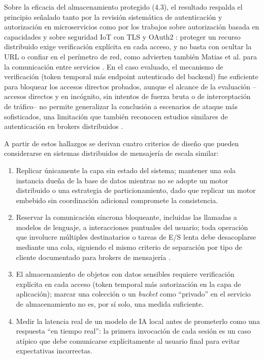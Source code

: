 Sobre la eficacia del almacenamiento protegido (4.3), el resultado respalda
el principio señalado tanto por la revisión sistemática de autenticación y
autorización en microservicios \cite{ref12} como por los trabajos sobre
autorización basada en capacidades \cite{ref11} y sobre seguridad IoT con TLS
y OAuth2 \cite{ref14}: proteger un recurso distribuido exige verificación
explícita en cada acceso, y no basta con ocultar la URL o confiar en el
perímetro de red, como advierten también Matias et al. para la comunicación
entre servicios \cite{ref3}. En el caso evaluado, el mecanismo de
verificación (token temporal más endpoint autenticado del backend) fue
suficiente para bloquear los accesos directos probados, aunque el alcance de
la evaluación --accesos directos y en incógnito, sin intentos de fuerza bruta
o de interceptación de tráfico-- no permite generalizar la conclusión a
escenarios de ataque más sofisticados, una limitación que también reconocen
estudios similares de autenticación en brokers distribuidos \cite{ref13}.

A partir de estos hallazgos se derivan cuatro criterios de diseño que pueden
considerarse en sistemas distribuidos de mensajería de escala similar:

\begin{enumerate}
  \item Replicar únicamente la capa sin estado del sistema; mantener una
  sola instancia dueña de la base de datos mientras no se adopte un motor
  distribuido o una estrategia de particionamiento, dado que replicar un
  motor embebido sin coordinación adicional compromete la consistencia.
  \item Reservar la comunicación síncrona bloqueante, incluidas las
  llamadas a modelos de lenguaje, a interacciones puntuales del usuario;
  toda operación que involucre múltiples destinatarios o tareas de E/S
  lenta debe desacoplarse mediante una cola, siguiendo el mismo criterio de
  separación por tipo de cliente documentado para brokers de mensajería
  \cite{ref2}.
  \item El almacenamiento de objetos con datos sensibles requiere
  verificación explícita en cada acceso (token temporal más autorización en
  la capa de aplicación); marcar una colección o un \emph{bucket} como
  ``privado'' en el servicio de almacenamiento no es, por sí solo, una
  medida suficiente.
  \item Medir la latencia real de un modelo de IA local antes de
  prometerlo como una respuesta ``en tiempo real'': la primera invocación
  de cada sesión es un caso atípico que debe comunicarse explícitamente al
  usuario final para evitar expectativas incorrectas.
\end{enumerate}

